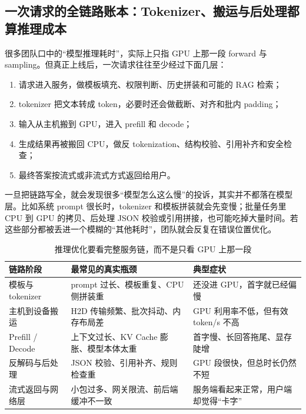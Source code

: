 \subsection{一次请求的全链路账本：Tokenizer、搬运与后处理都算推理成本}
很多团队口中的“模型推理耗时”，实际上只指 GPU 上那一段 forward 与 sampling。但真正上线后，一次请求往往至少经过下面几层：
\begin{enumerate}
  \item 请求进入服务，做模板填充、权限判断、历史拼装和可能的 RAG 检索；
  \item tokenizer 把文本转成 token，必要时还会做截断、对齐和批内 padding；
  \item 输入从主机搬到 GPU，进入 prefill 和 decode；
  \item 生成结果再被搬回 CPU，做反 tokenization、结构校验、引用补齐和安全检查；
  \item 最终答案按流式或非流式方式返回给用户。
\end{enumerate}

一旦把链路写全，就会发现很多“模型怎么这么慢”的投诉，其实并不都落在模型层。比如系统 prompt 很长时，tokenizer 和模板拼装就会先变慢；批量任务里 CPU 到 GPU 的拷贝、后处理 JSON 校验或引用拼接，也可能吃掉大量时间。若这些部分都被丢进一个模糊的“其他耗时”，团队就会反复在错误位置优化。

\begin{table}[H]
\centering
\small
\begin{tabularx}{\textwidth}{>{\raggedright\arraybackslash}p{3cm}>{\raggedright\arraybackslash}p{3.3cm}>{\raggedright\arraybackslash}X}
\toprule
\textbf{链路阶段} & \textbf{最常见的真实瓶颈} & \textbf{典型症状} \\
\midrule
模板与 tokenizer & prompt 过长、模板重复、CPU 侧拼装重 & 还没进 GPU，首字就已经偏慢 \\
主机到设备搬运 & H2D 传输频繁、批次抖动、内存布局差 & GPU 利用率不低，但有效 token/s 不高 \\
Prefill / Decode & 上下文过长、KV Cache 膨胀、模型本体太重 & 首字慢、长回答拖尾、显存陡增 \\
反解码与后处理 & JSON 校验、引用补齐、规则检查重 & GPU 段很快，但总时长仍然不短 \\
流式返回与网络层 & 小包过多、网关限流、前后端缓冲不一致 & 服务端看起来正常，用户端却觉得“卡字” \\
\bottomrule
\end{tabularx}
\caption{推理优化要看完整服务链，而不是只看 GPU 上那一段}
\label{tab:end-to-end-serving-pipeline}
\end{table}

